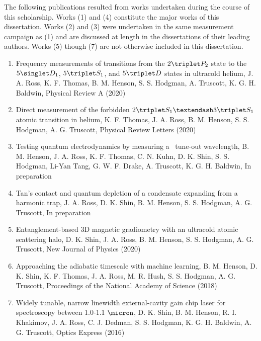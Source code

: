 The following publications resulted from works undertaken during the course of this scholarship. Works (1) and (4) constitute the major works of this dissertation. Works (2) and (3) were undertaken in the same measurement campaign as (1) and are discussed at length in the dissertations of their leading authors. Works (5) though (7) are not otherwise included in this dissertation.

\begin{enumerate}
\item{Frequency measurements of transitions from the $2\triplet P_2$ state to the $5 \singlet D_1$, $5\triplet S_1$, and $5\triplet D$ states in ultracold helium, J. A. Ross, K. F. Thomas, B. M. Henson, S. S. Hodgman, A. Truscott, K. G. H. Baldwin, {Physical Review A} (2020) }
\item{Direct measurement of the forbidden $2\triplet S_1 – 3\triplet S_1$ atomic transition in helium,  K. F. Thomas, J. A. Ross, B. M. Henson, S. S. Hodgman, A. G. Truscott, {Physical Review Letters} (2020)}
\item{Testing quantum electrodynamics by measuring a \mhe~tune-out wavelength, B. M. Henson, J. A. Ross, K. F. Thomas, C. N. Kuhn, D. K. Shin, S. S. Hodgman, Li-Yan Tang, G. W. F. Drake, A. Truscott, K. G. H. Baldwin, {In preparation}}
\item{Tan's contact and quantum depletion of a condensate expanding from a harmonic trap, J. A. Ross, D. K. Shin, B. M. Henson, S. S. Hodgman, A. G. Truscott, {In preparation}}
\item{Entanglement-based 3D magnetic gradiometry with an ultracold atomic scattering halo, D. K. Shin, J. A. Ross, B. M. Henson, S. S. Hodgman, A. G. Truscott, New Journal of Physics (2020)}
\item{Approaching the adiabatic timescale with machine learning, B. M. Henson, D. K. Shin, K. F. Thomas, J. A. Ross, M. R. Hush, S. S. Hodgman, A. G. Truscott, {Proceedings of the National Academy of Science} (2018)}
\item{Widely tunable, narrow linewidth external-cavity gain chip laser for spectroscopy between 1.0-1.1 $\micron$, D. K. Shin, B. M. Henson, R. I.  Khakimov, J. A. Ross, C. J.  Dedman, S. S.  Hodgman, K. G. H.  Baldwin, A. G.  Truscott, {Optics Express} (2016)}
\end{enumerate}














